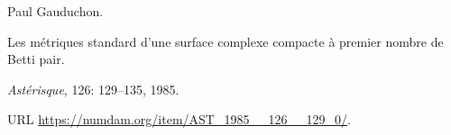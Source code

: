 Paul Gauduchon.

\newblock Les m\'etriques standard d'une surface complexe compacte \`a premier
  nombre de {Betti} pair.

\newblock \emph{Ast\'erisque}, 126: 129--135, 1985.

\newblock URL \url{https://numdam.org/item/AST_1985__126__129_0/}.
